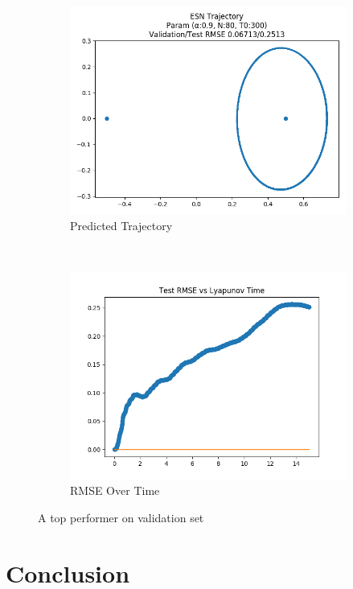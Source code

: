 \documentclass{article}
\begin{document}
\begin{figure}[H]
    \centering
    \begin{subfigure}[b]{0.45\textwidth}
        \includegraphics[width=\textwidth]{doc/paper/images/r3body/rank_4_param_448_fit.png}
        \caption{Predicted Trajectory}
    \end{subfigure}
    ~
    \begin{subfigure}[b]{0.45\textwidth}
        \includegraphics[width=\textwidth]{doc/paper/images/r3body/rank_4_param_448_rmse.png}
        \caption{RMSE Over Time}
    \end{subfigure}
    \caption{A top performer on validation set}
\end{figure}


\section{Conclusion}



\end{document}
